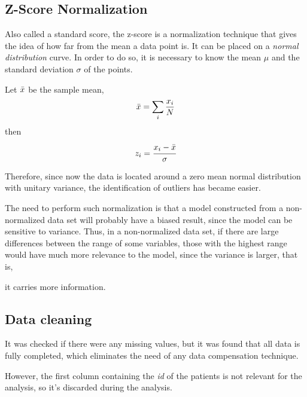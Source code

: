 \documentclass[conference]{IEEEtran}
\begin{document}
\subsection{Z-Score Normalization}

Also called a standard score, the z-score is a normalization technique that gives the 
idea of how far from the mean a data point is. It can be placed on a 
\textit{normal distribution} curve. In order to do so, it is necessary to know the 
mean $\mu$ and the standard deviation $\sigma$ of the points.

Let $\Bar{x}$ be the sample mean,
$$\Bar{x} = \sum_i \frac{x_i}{N}$$
then
$$z_i = \cfrac{x_i - \Bar{x}}{\sigma}$$

Therefore, since now the data is located around a zero mean normal distribution with 
unitary variance, the identification of outliers has became easier.

The need to perform such normalization is that a model constructed from a 
non-normalized data set will probably have a biased result, since the model can be 
sensitive to variance. Thus, in a non-normalized data set, if there are large 
differences between the range of some variables, those with the highest range would 
have much more relevance to the model, since the variance is larger, that is, 

it carries more information.

\subsection{Data cleaning}\label{AA}
It was checked if there were any missing values, but it was found that all data is fully completed, 
which eliminates the need of any data compensation technique.

However, the first column containing the \textit{id} of the patients is not relevant for the analysis, so it's discarded during the analysis.
\end{document}
